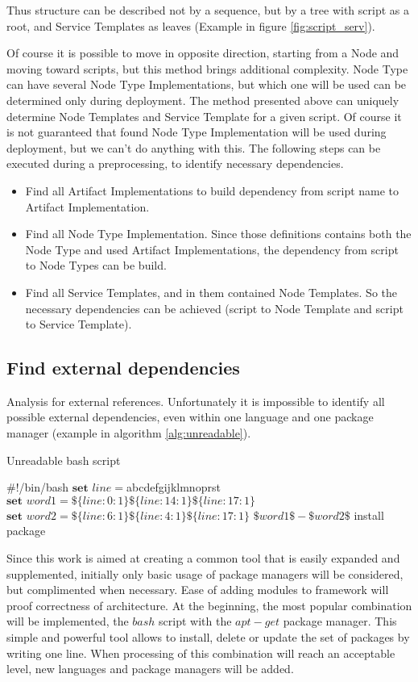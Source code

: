 Thus structure can be described not by a sequence, but by a tree with script as a root, and Service Templates as leaves (Example in figure \ref{fig:script_serv}). 

Of course it is possible to move in opposite direction, starting from a Node and moving toward scripts, but this method brings additional complexity. 
Node Type can have several Node Type Implementations, but which one will be used can be determined only during deployment. 
The method presented above can uniquely determine Node Templates and Service Template for a given script.
Of course it is not guaranteed that found Node Type Implementation will be used during deployment, but we can't do anything with this. 
The following steps can be executed during a preprocessing, to identify necessary dependencies.
\begin{itemize}
	\item Find all Artifact Implementations to build dependency from script name to Artifact Implementation.
	\item Find all Node Type Implementation. Since those definitions contains both the Node Type and used Artifact Implementations, the dependency from script to Node Types can be build.
	\item Find all Service Templates, and in them contained Node Templates. So the necessary dependencies can be achieved (script to Node Template and script to Service Template).
\end{itemize}
\subsection*{Find external dependencies}
Analysis for external references.
Unfortunately it is impossible to identify all possible external dependencies, even within one language and one package manager (example in algorithm \ref{alg:unreadable}).
\begin{Algorithmus} 
	\caption{Unreadable bash script}
	\label{alg:unreadable}
	\begin{algorithmic}
		\State	\#!/bin/bash
		\State	$\textbf{set } line = $abcdefgijklmnoprst
		\State	$\textbf{set } word1 = \$\{line:0:1\}\$\{line:14:1\}\$\{line:17:1\}$ 
		\State  $\textbf{set } word2 = \$\{line:6:1\}\$\{line:4:1\}\$\{line:17:1\}$
		\State  $\$word1\$-\$word2\$$ install package
	\end{algorithmic}
\end{Algorithmus}
Since this work is aimed at creating a common tool that is easily expanded and supplemented, initially only basic usage of package managers will be considered, but complimented when necessary. 
Ease of adding modules to framework will proof correctness of architecture.
At the beginning, the most popular combination will be implemented, the $bash$ script with the $apt-get$ package manager.
This simple and powerful tool allows to install, delete or update the set of packages by writing one line.
When processing of this combination will reach an acceptable level, new languages and package managers will be added.
